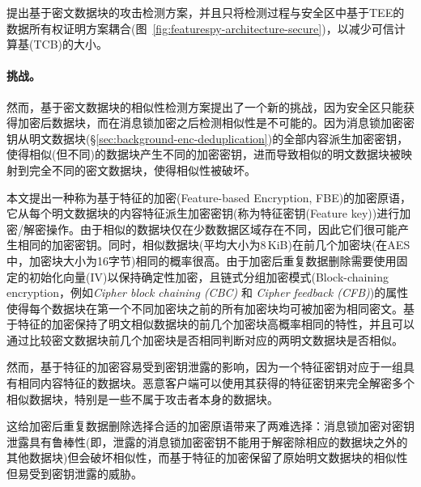 \sysnameF 提出基于密文数据块的攻击检测方案，并且只将检测过程与安全区中基于TEE的数据所有权证明方案耦合(图~\ref{fig:featurespy-architecture-secure})，以减少可信计算基(TCB)的大小。

\paragraph*{挑战。}
然而，基于密文数据块的相似性检测方案提出了一个新的挑战，因为安全区只能获得加密后数据块，而在消息锁加密之后检测相似性是不可能的。因为消息锁加密密钥从明文数据块(\S\ref{sec:background-enc-deduplication})的全部内容派生加密密钥，使得相似(但不同)的数据块产生不同的加密密钥，进而导致相似的明文数据块被映射到完全不同的密文数据块，使得相似性被破坏。

本文提出一种称为基于特征的加密(Feature-based Encryption, FBE)的加密原语，它从每个明文数据块的内容特征派生加密密钥(称为特征密钥(Feature key))进行加密/解密操作。由于相似的数据块仅在少数数据区域存在不同，因此它们很可能产生相同的加密密钥。同时，相似数据块(平均大小为8\,KiB)在前几个加密块(在AES中，加密块大小为16字节)相同的概率很高。由于加密后重复数据删除\cite{douceur2002reclaiming, shah15}需要使用固定的初始化向量(IV)以保持确定性加密，且链式分组加密模式(Block-chaining encryption，例如\textit{Cipher block chaining (CBC)} 和 \textit{Cipher feedback (CFB)}\cite{dworkin01})的属性使得每个数据块在第一个不同加密块之前的所有加密块均可被加密为相同密文。基于特征的加密保持了明文相似数据块的前几个加密块高概率相同的特性，并且可以通过比较密文数据块前几个加密块是否相同判断对应的两明文数据块是否相似。

然而，基于特征的加密容易受到密钥泄露的影响，因为一个特征密钥对应于一组具有相同内容特征的数据块。恶意客户端可以使用其获得的特征密钥来完全解密多个相似数据块，特别是一些不属于攻击者本身的数据块。

这给加密后重复数据删除选择合适的加密原语带来了两难选择：消息锁加密对密钥泄露具有鲁棒性(即，泄露的消息锁加密密钥不能用于解密除相应的数据块之外的其他数据块)但会破坏相似性，而基于特征的加密保留了原始明文数据块的相似性但易受到密钥泄露的威胁。
